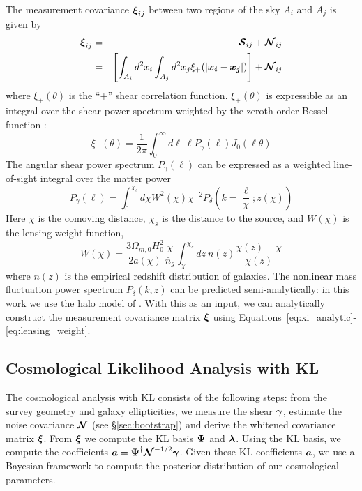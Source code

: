 The measurement covariance $\boldsymbol{\xi}_{ij}$ between two regions of the
sky $A_i$ and $A_j$ is given by
\begin{eqnarray}
  \label{eq:xi_analytic}
  \boldsymbol{\xi}_{ij} 
  &=& \boldsymbol{\mathcal{S}}_{ij} + \boldsymbol{\mathcal{N}}_{ij} \nonumber\\
  &=& \left[\int_{A_i}d^2x_i\int_{A_j}d^2x_j 
    \xi_+(|\boldsymbol{x_i}-\boldsymbol{x_j}|)\right]
  + \boldsymbol{\mathcal{N}}_{ij}
\end{eqnarray}
where $\xi_+(\theta)$ is the ``+'' shear correlation function. 
$\xi_+(\theta)$ is expressible as an integral over the shear power spectrum
weighted by the zeroth-order Bessel function
\citep[see, e.g.][]{Schneider02}:
\begin{equation}
  \label{eq:xi_plus_def}
  \xi_+(\theta) 
  = \frac{1}{2\pi} \int_0^\infty d\ell\ \ell P_\gamma(\ell) J_0(\ell\theta)
\end{equation}
The angular shear power spectrum $P_\gamma(\ell)$ can be expressed as a
weighted line-of-sight integral over the matter power
\begin{equation}
  P_\gamma(\ell) = \int_0^{\chi_s}d\chi W^2(\chi)\chi^{-2}
  P_\delta\left(k=\frac{\ell}{\chi};z(\chi)\right)
\end{equation}
Here $\chi$ is the comoving distance, $\chi_s$ is the distance to the
source, and $W(\chi)$ is the lensing weight function,
\begin{equation}
  \label{eq:lensing_weight}
  W(\chi) = \frac{3\Omega_{m,0}H_0^2}{2a(\chi)}\frac{\chi}{\bar{n}_g}
  \int_{\chi}^{\chi_s}dz\ n(z) \frac{\chi(z)-\chi}{\chi(z)}
\end{equation}
where $n(z)$ is the empirical redshift distribution of galaxies.
The nonlinear mass fluctuation power spectrum $P_\delta(k, z)$ can be
predicted semi-analytically: in this work we use the halo model of
\citet{Smith03}.  With this as an input, we can analytically
construct the measurement covariance matrix $\boldsymbol{\xi}$ using 
Equations~\ref{eq:xi_analytic}-\ref{eq:lensing_weight}.

\subsection{Cosmological Likelihood Analysis with KL}
The cosmological analysis with KL consists of the following steps:
from the survey geometry and galaxy ellipticities, we measure the
shear $\boldsymbol{\gamma}$, estimate the noise covariance
$\boldsymbol{\mathcal{N}}$ (see \S\ref{sec:bootstrap}) and derive
the whitened covariance matrix $\boldsymbol{\xi}$. 
From $\boldsymbol{\xi}$ we compute the KL basis $\boldsymbol{\Psi}$ and $\boldsymbol{\lambda}$.
Using the KL basis, we compute the coefficients
$\boldsymbol{a} = \boldsymbol{\Psi}^\dagger \boldsymbol{\mathcal{N}}^{-1/2} \boldsymbol{\gamma}$.
Given these KL coefficients $\boldsymbol{a}$, we use a Bayesian framework to
compute the posterior distribution of our cosmological parameters.

